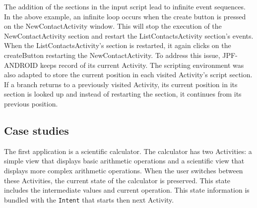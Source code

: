 \documentclass{acm_proc_article-sp}
\begin{document}
The addition of the sections in the input script lead to infinite event sequences. In the above example, an infinite loop occurs when the
create button is pressed on the NewContactActivity window. This will stop the execution of the NewContactActivity section and restart
the ListContactsActivity section's events. When the ListContactsActivity's section is restarted, it again clicks on the createButton
restarting the NewContactActivity. To address this issue, JPF-ANDROID keeps record of its current Activity. The scripting environment was
also adapted to store the current position in each visited Activity's script section. If a branch returns to a previously visited
Activity, its current position in its section is looked up and instead of restarting the section, it continues from its previous position.

\subsection{Case studies}
The first application is a scientific calculator. The calculator has two Activities: a simple view that
displays basic arithmetic operations and a scientific view that displays more complex arithmetic operations. When the user switches
between these Activities, the current state of the calculator is preserved. This state includes the intermediate values and current
operation. This state information is bundled with the \texttt{Intent} that starts then next Activity.
\end{document}
